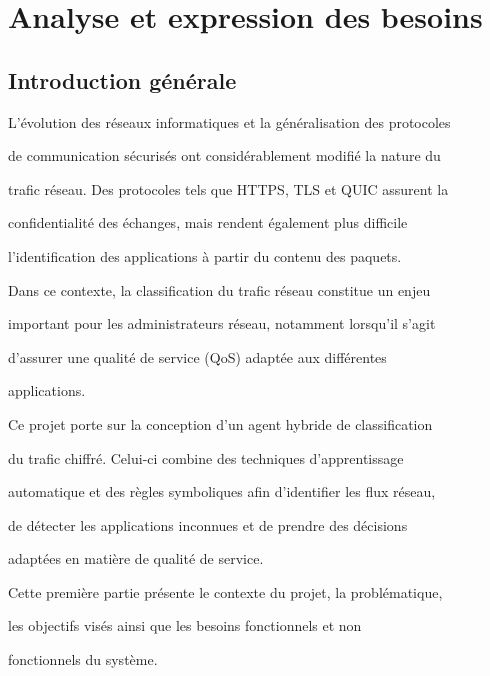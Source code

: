 


\chapter{Analyse et expression des besoins}



\section{Introduction générale}



L'évolution des réseaux informatiques et la généralisation des protocoles

de communication sécurisés ont considérablement modifié la nature du

trafic réseau. Des protocoles tels que HTTPS, TLS et QUIC assurent la

confidentialité des échanges, mais rendent également plus difficile

l'identification des applications à partir du contenu des paquets.



Dans ce contexte, la classification du trafic réseau constitue un enjeu

important pour les administrateurs réseau, notamment lorsqu'il s'agit

d'assurer une qualité de service (QoS) adaptée aux différentes

applications.



Ce projet porte sur la conception d'un agent hybride de classification

du trafic chiffré. Celui-ci combine des techniques d'apprentissage

automatique et des règles symboliques afin d'identifier les flux réseau,

de détecter les applications inconnues et de prendre des décisions

adaptées en matière de qualité de service.



Cette première partie présente le contexte du projet, la problématique,

les objectifs visés ainsi que les besoins fonctionnels et non

fonctionnels du système.



